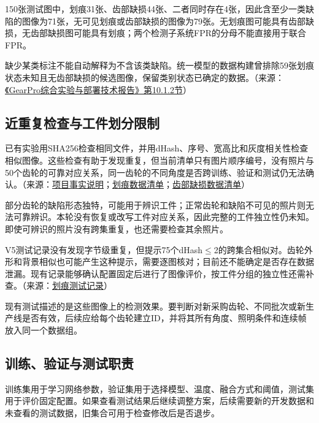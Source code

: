 150张测试图中，划痕31张、齿部缺损44张、二者同时存在4张，因此含至少一类缺陷的图像为71张，无可见划痕或齿部缺损的图像为79张。无划痕图可能具有齿部缺损，无齿部缺损图可能具有划痕；两个检测子系统FPR的分母不能直接用于联合FPR。

缺少某类标注不能自动解释为不含该类缺陷。统一模型的数据构建曾排除59张划痕状态未知且无齿部缺损的候选图像，保留类别状态已确定的数据。（来源：\protect\href{run:../GearPro_综合技术报告_Markdown含配图/GearPro_综合实验与部署技术报告.md}{《GearPro综合实验与部署技术报告》第10.1.2节}）

\FloatBarrier{}\subsection{近重复检查与工件划分限制}
已有实验用SHA256检查相同文件，并用dHash、序号、宽高比和灰度相关性检查相似图像。这些检查有助于发现重复，但当前清单只有图片顺序编号，没有照片与50个齿轮的可靠对应关系，同一齿轮的不同角度是否跨训练、验证和测试仍无法确认。（来源：\protect\hyperlink{project-facts}{项目事实说明}；\protect\hyperlink{source-5}{划痕数据清单}；\protect\hyperlink{source-6}{齿部缺损数据清单}）

部分齿轮的缺陷形态独特，可能用于辨识工件；正常齿轮和缺陷不可见的照片则无法可靠辨识。本轮没有恢复或改写工件对应关系，因此完整的工件独立性仍未知。即使可辨识的照片没有跨集重复，也还需要检查其余照片。

V5测试记录没有发现字节级重复，但提示75个dHash\ensuremath{\leq}2的跨集合相似对。齿轮外形和背景相似也可能产生这种提示，需要逐图核对；目前还不能确定是否存在数据泄漏。现有记录能够确认配置固定后进行了图像评价，按工件分组的独立性还需补查。（来源：\protect\hyperlink{source-3}{划痕测试记录}）

现有测试描述的是这些图像上的检测效果。要判断对新采购齿轮、不同批次或新生产线是否有效，后续应给每个齿轮建立ID，并将其所有角度、照明条件和连续帧放入同一个数据组。

\FloatBarrier{}\subsection{训练、验证与测试职责}
训练集用于学习网络参数，验证集用于选择模型、温度、融合方式和阈值，测试集用于评价固定配置。如果查看测试结果后继续调整方案，后续需要新的开发数据和未查看的测试数据，旧集合可用于检查修改后是否退步。\cite{ref1}\cite{ref2}

